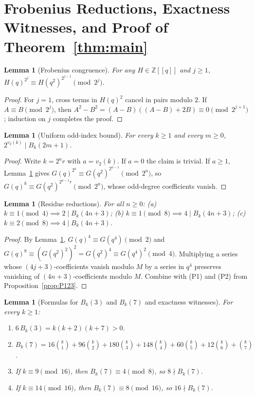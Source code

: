 \documentclass[11pt]{article}
\newtheorem{lemma}[theorem]{Lemma}
\begin{document}
\section{Frobenius Reductions, Exactness Witnesses, and Proof of Theorem~\ref{thm:main}}

\begin{lemma}[Frobenius congruence]\label{lem:frob}
For any $H \in \mathbb{Z}[[q]]$ and $j \ge 1$, $H(q)^{2^j} \equiv H(q^2)^{2^{j-1}} \pmod{2^j}$.
\end{lemma}

\begin{proof}
For $j = 1$, cross terms in $H(q)^2$ cancel in pairs modulo $2$. If $A \equiv B \pmod{2^j}$, then $A^2 - B^2 = (A - B)((A - B) + 2B) \equiv 0 \pmod{2^{j+1}}$; induction on $j$ completes the proof.
\end{proof}

\begin{lemma}[Uniform odd-index bound]\label{lem:odd}
For every $k \ge 1$ and every $m \ge 0$, $2^{v_2(k)} \mid B_k(2m+1)$.
\end{lemma}

\begin{proof}
Write $k = 2^a r$ with $a = v_2(k)$. If $a = 0$ the claim is trivial. If $a \ge 1$, Lemma~\ref{lem:frob} gives $G(q)^{2^a} \equiv G(q^2)^{2^{a-1}} \pmod{2^a}$, so $G(q)^k \equiv G(q^2)^{2^{a-1} r} \pmod{2^a}$, whose odd-degree coefficients vanish.
\end{proof}

\begin{lemma}[Residue reductions]\label{lem:res}
For all $n \ge 0$: (a) $k \equiv 1 \pmod 4 \implies 2 \mid B_k(4n+3)$; (b) $k \equiv 1 \pmod 8 \implies 4 \mid B_k(4n+3)$; (c) $k \equiv 2 \pmod 8 \implies 4 \mid B_k(4n+3)$.
\end{lemma}

\begin{proof}
By Lemma~\ref{lem:frob}, $G(q)^4 \equiv G(q^4) \pmod 2$ and
$G(q)^8 \equiv (G(q^2)^2)^2 = G(q^2)^4 \equiv G(q^4)^2 \pmod 4$.
Multiplying a series whose $(4j+3)$-coefficients vanish modulo $M$ by a series in $q^4$ preserves vanishing of $(4n+3)$-coefficients modulo $M$. Combine with (P1) and (P2) from Proposition~\ref{prop:P123}.
\end{proof}

\begin{lemma}[Formulas for $B_k(3)$ and $B_k(7)$ and exactness witnesses]\label{lem:witness}
For every $k \ge 1$:
\begin{enumerate}
\item $6\, B_k(3) = k(k+2)(k+7) > 0$.
\item $B_k(7) = 16\binom{k}{1} + 96\binom{k}{2} + 180\binom{k}{3} + 148\binom{k}{4} + 60\binom{k}{5} + 12\binom{k}{6} + \binom{k}{7}$.
\item If $k \equiv 9 \pmod{16}$, then $B_k(7) \equiv 4 \pmod 8$, so $8 \nmid B_k(7)$.
\item If $k \equiv 14 \pmod{16}$, then $B_k(7) \equiv 8 \pmod{16}$, so $16 \nmid B_k(7)$.
\end{enumerate}
\end{lemma}
\end{document}
